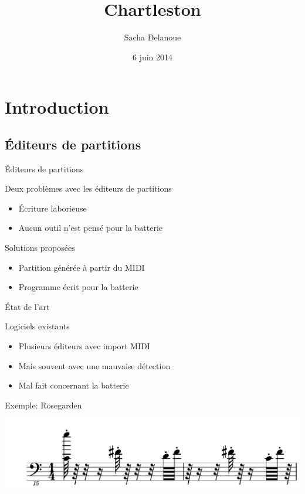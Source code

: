\documentclass{beamer}
\title{Chartleston}
\author{Sacha Delanoue}
\date{6 juin 2014}
\begin{document}
\begin{frame}
    \titlepage
\end{frame}

\section{Introduction}

\subsection{Éditeurs de partitions}

\begin{frame}{Éditeurs de partitions}
    \begin{alertblock}{Deux problèmes avec les éditeurs de partitions}
        \begin{itemize}
            \item Écriture laborieuse
            \item Aucun outil n’est pensé pour la batterie
        \end{itemize}
    \end{alertblock}

    \begin{block}{Solutions proposées}
        \begin{itemize}
            \item Partition générée à partir du MIDI
            \item Programme écrit pour la batterie
        \end{itemize}
    \end{block}
\end{frame}

\begin{frame}{État de l’art}
    \begin{block}{Logiciels existants}
        \begin{itemize}
            \item Plusieurs éditeurs avec import MIDI
            \item Mais souvent avec une mauvaise détection
            \item Mal fait concernant la batterie
        \end{itemize}
    \end{block}
    \begin{exampleblock}{Exemple: Rosegarden}
        \begin{center}
            \includegraphics[width=\textwidth]{figures/rosegarden.pdf}
        \end{center}
    \end{exampleblock}
\end{frame}
\end{document}
